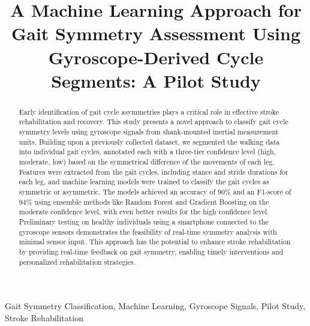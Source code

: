 \documentclass[conference]{IEEEtran}
\begin{document}
\title{A Machine Learning Approach for Gait Symmetry Assessment Using Gyroscope-Derived Cycle Segments: A Pilot Study\\
{\footnotesize}
}

\author{
\and
{}
\and
{}
}

\maketitle

\begin{abstract}
Early identification of gait cycle asymmetries plays a critical role in effective stroke rehabilitation and recovery. This study presents 
a novel approach to classify gait cycle symmetry levels using gyroscope signals from shank-mounted inertial measurement units. 
Building upon a previously collected dataset, we segmented the walking data into individual gait cycles, annotated each with a three-tier 
confidence level (high, moderate, low) based on the symmetrical difference of the movements of each leg. Features were extracted from the
gait cycles, including stance and stride durations for each leg, and machine learning models were trained to classify the gait cycles as symmetric or asymmetric. 
The models achieved an accuracy of 90\% and an F1-score of 94\% using ensemble methods like Random Forest and Gradient Boosting on the moderate confidence 
level, with even better results for the high confidence level. Preliminary testing on healthy individuals using a smartphone connected to the gyroscope sensors 
demonstrates the feasibility of real-time symmetry analysis with minimal sensor input. This approach has the potential to enhance stroke rehabilitation by 
providing real-time feedback on gait symmetry, enabling timely interventions and personalized rehabilitation strategies.

\end{abstract}
\begin{IEEEkeywords}
Gait Symmetry Classification, Machine Learning, Gyroscope Signals, Pilot Study, Stroke Rehabilitation
\end{IEEEkeywords}




\newpage






\end{document}
